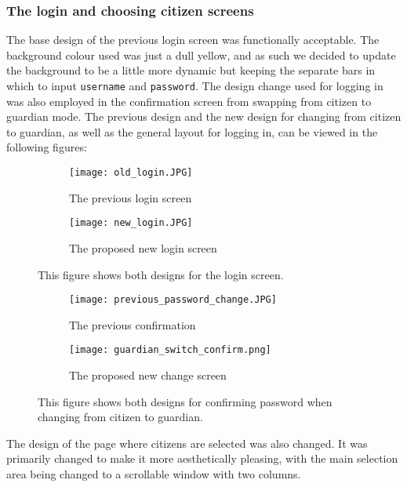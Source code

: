 \subsubsection{The login and choosing citizen screens}
The base design of the previous login screen was functionally acceptable. 
The background colour used was just a dull yellow, and as such we decided to update the background to be a little more dynamic but keeping the separate bars in which to input \texttt{username} and \texttt{password}.
The design change used for logging in was also employed in the confirmation screen from swapping from citizen to guardian mode. 
The previous design and the new design for changing from citizen to guardian, as well as the general layout for logging in, can be viewed in the following figures:
\begin{figure}[H]
    \begin{subfigure}{0.5\textwidth}
    \texttt{[image: old\_login.JPG]} 
    \caption{The previous login screen}
    \label{fig:previous_login}
    \end{subfigure}
    \begin{subfigure}{0.5\textwidth}
        \texttt{[image: new\_login.JPG]}
    \caption{The proposed new login screen}
    \label{fig:new_login}
    \end{subfigure} 
    \caption{This figure shows both designs for the login screen.}
    \label{fig:guardian_confirm}
\end{figure}
\noindent
\begin{figure}[H]
    \begin{subfigure}{0.5\textwidth}
    \texttt{[image: previous\_password\_change.JPG]} 
    \caption{The previous confirmation}
    \label{fig:previous_guardian_confirm}
    \end{subfigure}
    \begin{subfigure}{0.5\textwidth}
        \texttt{[image: guardian\_switch\_confirm.png]}
    \caption{The proposed new change screen}
    \label{fig:new_guardian_confirm}
    \end{subfigure} 
    \caption{This figure shows both designs for confirming password when changing from citizen to guardian.}
    \label{fig:guardian_confirm}
\end{figure}
\noindent
The design of the page where citizens are selected was also changed.
It was  primarily changed to make it more aesthetically pleasing, with the main selection area being changed to a scrollable window with two columns. 
